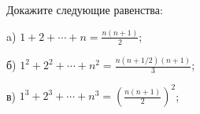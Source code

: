 Докажите следующие равенства:
\begin{itemtask}
    \item [a)] $1 + 2 + \dotsb + n = \frac{n (n + 1)}{2}$;
    \item [б)] $1^2 + 2^2 + \dotsb + n^2 = \frac{n (n + 1 / 2)(n + 1)}{3}$;
    \item [в)] $1^3 + 2^3 + \dotsb + n^3 = \left( \frac{n (n + 1)}{2} \right)^2$;
\end{itemtask}
